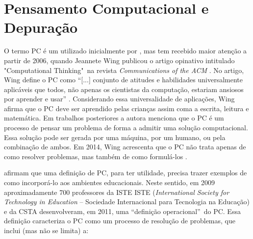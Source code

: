 



\section{Pensamento Computacional e Depuração}
\label{fundamentacao_pc}

O termo \acl{PC} é um utilizado inicialmente por , mas tem recebido maior atenção a partir de 2006, quando Jeannete Wing publicou o artigo opinativo intitulado "Computational Thinking"\ na revista \textit{Communications of the ACM} \cite{wing_computational_2006}. No artigo, Wing define o \ac{PC} como “[...] conjunto de atitudes e habilidades universalmente aplicáveis que todos, não apenas os cientistas da computação, estariam ansiosos por aprender e usar” \cite[p.33, tradução nossa]{wing_computational_2006}. Considerando essa universalidade de aplicações, Wing afirma que o \ac{PC} deve ser aprendido pelas crianças assim coma a escrita, leitura e matemática. Em trabalhos posteriores a autora menciona que o \acl{PC} é um processo de pensar um problema de forma a admitir uma solução computacional. Essa solução pode ser gerada por uma máquina, por um humano, ou pela combinação de ambos. Em 2014, Wing acrescenta que o \ac{PC} não trata apenas de como resolver problemas, mas também de como formulá-los \cite{wing_computational_2014}.

 afirmam que uma definição de \ac{PC}, para ter utilidade, precisa trazer exemplos de como incorporá-lo aos ambientes educacionais. Neste sentido, em 2009 aproximadamente 700 professores da \ac{ISTE} ISTE (\textit{International Society for Technology in Education} -- Sociedade Internacional para Tecnologia na Educação) e da \ac{CSTA} desenvolveram, em 2011, uma “definição operacional”\ do \acl{PC}. Essa definição caracteriza o \ac{PC} como um processo de resolução de problemas, que inclui (mas não se limita) a:

